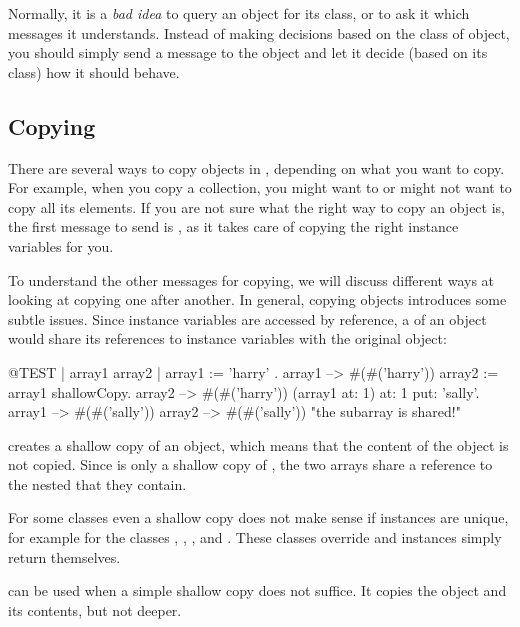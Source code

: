 \documentclass[a4paper,10pt,twoside]{book}
\begin{document}
Normally, it is a \emph{bad idea} to query an object for its class, or to ask it which messages it understands.
Instead of making decisions based on the class of object, you should simply send a message to the object and let it decide (\ie based on its class) how it should behave.

\subsection{Copying}

There are several ways to copy objects in \sq, depending on what you want to copy. For example, when you copy a collection, you might want to or might not want to copy all its elements. If you are not sure what the right way to copy an object is, the first message to send is , as it takes care of copying the right instance variables for you.

To understand the other messages for copying, we will discuss different ways at looking at copying one after another. 
In general, copying objects introduces some subtle issues.
Since instance variables are accessed by reference, a  of an object would share its references to instance variables with the original object:

\begin{code}{@TEST | array1 array2 |}
array1 := { { 'harry' } }.
array1 --> #(#('harry'))
array2 := array1 shallowCopy.
array2 --> #(#('harry'))
(array1 at: 1) at: 1 put: 'sally'.
array1 --> #(#('sally'))
array2 --> #(#('sally'))    "the subarray is shared!"
\end{code}

 creates a shallow copy of an object, which means that the content of the object is not copied.
Since  is only a shallow copy of , the two arrays share a reference to the nested  that they contain.

For some classes even a shallow copy does not make sense if instances are unique, for example for the classes , , ,  and . These classes override  and instances simply return themselves.

 can be used when a simple shallow copy does not suffice. It copies the object and its contents, but not deeper.
\end{document}
